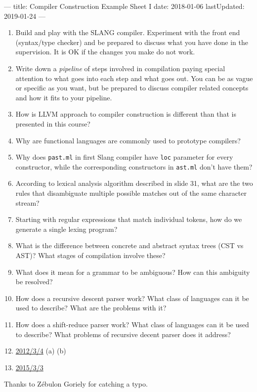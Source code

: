 ---
title: Compiler Construction Example Sheet I
date: 2018-01-06
lastUpdated: 2019-01-24
---



\begin{enumerate}
  \item Build and play with the SLANG compiler. Experiment with the front end
    (syntax/type checker) and be prepared to discuss what you have done in the
    supervision. It is OK if the changes you make do not work.

  \item Write down a \emph{pipeline} of steps involved in compilation paying
    special attention to what goes into each step and what goes out. You can be
    as vague or specific as you want, but be prepared to discuss compiler
    related concepts and how it fits to your pipeline.

  \item How is \textsc{LLVM} approach to compiler construction is different
    than that is presented in this course?

  \item Why are functional languages are commonly used to prototype compilers?

  \item Why does \texttt{past.ml} in first Slang compiler have \texttt{loc}
    parameter for every constructor, while the corresponding constructors in
    \texttt{ast.ml} don't have them?

  \item According to lexical analysis algorithm described in slide 31, what are
    the two rules that disambiguate multiple possible matches out of the same
    character stream?

  \item Starting with regular expressions that match individual tokens, how do
    we generate a single lexing program?

  \item What is the difference between concrete and abstract syntax trees (CST
    vs AST)? What stages of compilation involve these?

  \item What does it mean for a grammar to be ambiguous? How can this ambiguity
    be resolved?

  \item How does a recursive descent parser work? What class of languages can it
    be used to describe? What are the problems with it?

  \item How does a shift-reduce parser work? What class of languages can it be
    used to describe? What problems of recursive decent parser does it address?

  \item \href{http://www.cl.cam.ac.uk/teaching/exams/pastpapers/y2012p3q4.pdf}{2012/3/4} (a) (b)

  \item \href{http://www.cl.cam.ac.uk/teaching/exams/pastpapers/y2015p3q3.pdf}{2015/3/3}
\end{enumerate}

Thanks to Zébulon Goriely for catching a typo.


